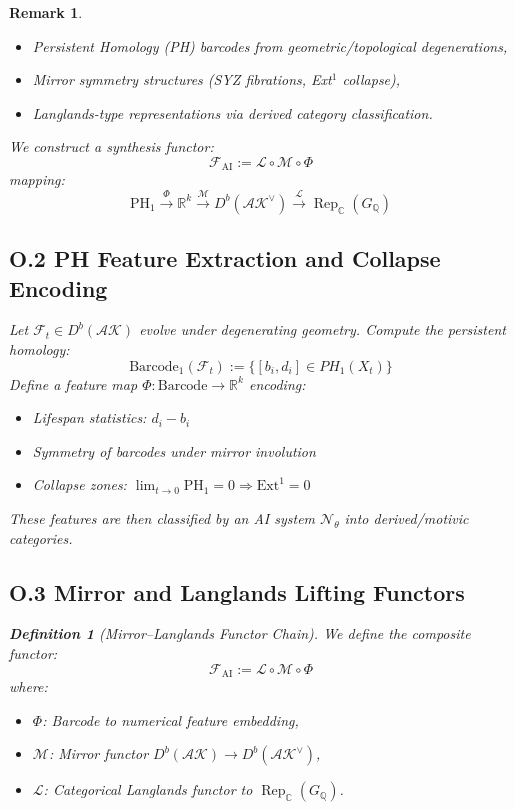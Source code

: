 \documentclass[11pt]{article}
\newtheorem{definition}[theorem]{Definition}
\newtheorem{remark}[theorem]{Remark}
\begin{document}
\begin{remark}
\begin{itemize}
  \item Persistent Homology (PH) barcodes from geometric/topological degenerations,
  \item Mirror symmetry structures (SYZ fibrations, Ext$^1$ collapse),
  \item Langlands-type representations via derived category classification.
\end{itemize}

We construct a synthesis functor:
\[
\mathscr{F}_{\mathrm{AI}} := \mathcal{L} \circ \mathcal{M} \circ \Phi
\]
mapping:
\[
\mathrm{PH}_1 \xrightarrow{\Phi} \mathbb{R}^k \xrightarrow{\mathcal{M}} D^b(\mathcal{AK}^\vee) \xrightarrow{\mathcal{L}} \operatorname{Rep}_{\mathbb{C}}(G_{\mathbb{Q}})
\]

\subsection*{O.2 PH Feature Extraction and Collapse Encoding}

Let \( \mathcal{F}_t \in D^b(\mathcal{AK}) \) evolve under degenerating geometry.  
Compute the persistent homology:
\[
\mathrm{Barcode}_1(\mathcal{F}_t) := \{ [b_i, d_i] \in PH_1(X_t) \}
\]
Define a feature map \( \Phi: \mathrm{Barcode} \to \mathbb{R}^k \) encoding:
\begin{itemize}
  \item Lifespan statistics: \( d_i - b_i \)
  \item Symmetry of barcodes under mirror involution
  \item Collapse zones: \( \lim_{t \to 0} \mathrm{PH}_1 = 0 \Rightarrow \mathrm{Ext}^1 = 0 \)
\end{itemize}

These features are then classified by an AI system \( \mathcal{N}_\theta \) into derived/motivic categories.

\subsection*{O.3 Mirror and Langlands Lifting Functors}

\begin{definition}[Mirror–Langlands Functor Chain]
We define the composite functor:
\[
\mathscr{F}_{\mathrm{AI}} := \mathcal{L} \circ \mathcal{M} \circ \Phi
\]
where:
\begin{itemize}
  \item \( \Phi \): Barcode to numerical feature embedding,
  \item \( \mathcal{M} \): Mirror functor \( D^b(\mathcal{AK}) \to D^b(\mathcal{AK}^\vee) \),
  \item \( \mathcal{L} \): Categorical Langlands functor to \( \operatorname{Rep}_{\mathbb{C}}(G_{\mathbb{Q}}) \).
\end{itemize}
\end{definition}


\end{remark}
\end{document}
